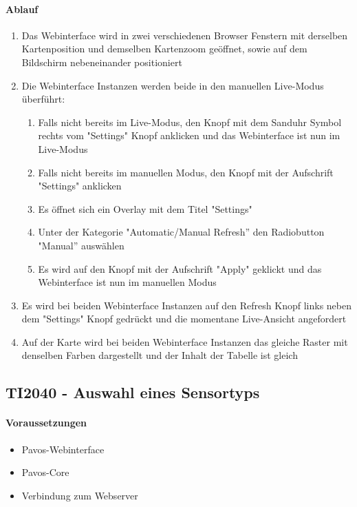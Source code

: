 \paragraph{Ablauf}
\begin{enumerate}
\item Das Webinterface wird in zwei verschiedenen Browser Fenstern mit derselben Kartenposition und demselben Kartenzoom geöffnet, sowie auf dem Bildschirm nebeneinander positioniert
\item Die Webinterface Instanzen werden beide in den manuellen Live-Modus überführt:
\begin{enumerate}
\item Falls nicht bereits im Live-Modus, den Knopf mit dem Sanduhr Symbol rechts vom "Settings" Knopf anklicken und das Webinterface ist nun im Live-Modus
\item Falls nicht bereits im manuellen Modus, den Knopf mit der Aufschrift "Settings" anklicken
\item Es öffnet sich ein Overlay mit dem Titel "Settings"
\item Unter der Kategorie "Automatic/Manual Refresh'' den Radiobutton "Manual'' auswählen
\item Es wird auf den Knopf mit der Aufschrift "Apply" geklickt und das Webinterface ist nun im manuellen Modus
\end{enumerate} 
\item Es wird bei beiden Webinterface Instanzen auf den Refresh Knopf  links neben dem "Settings" Knopf gedrückt und die momentane Live-Ansicht angefordert
\item Auf der Karte wird bei beiden Webinterface Instanzen das gleiche Raster mit denselben Farben dargestellt und der Inhalt der Tabelle ist gleich
\end{enumerate}
\szenarioGood

\subsection{TI2040 - Auswahl eines Sensortyps}
\paragraph{Voraussetzungen}
\begin{itemize}
\item Pavos-Webinterface
\item Pavos-Core
\item Verbindung zum Webserver
\end{itemize}
